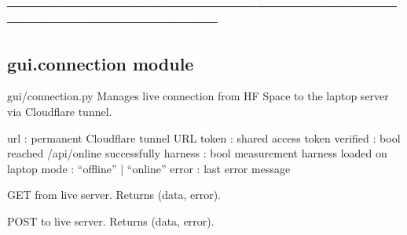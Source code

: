 \documentclass[letterpaper,10pt,english]{sphinxmanual}
\begin{document}
\sphinxAtStartPar
─────────────────────────────────────────────────────────────────────────────

\sphinxstepscope


\subsection{gui.connection module}
\label{\detokenize{gui.connection:module-gui.connection}}\label{\detokenize{gui.connection:gui-connection-module}}\label{\detokenize{gui.connection::doc}}
\sphinxAtStartPar
gui/connection.py
Manages live connection from HF Space to the laptop server via Cloudflare tunnel.
\begin{description}
\sphinxAtStartPar
url       : permanent Cloudflare tunnel URL
token     : shared access token
verified  : bool \sphinxhyphen{} reached /api/online successfully
harness   : bool \sphinxhyphen{} measurement harness loaded on laptop
mode      : “offline” | “online”
error     : last error message

\end{description}

\begin{fulllineitems}
\label{\detokenize{gui.connection:gui.connection.api_get}}
\pysigstartsignatures
\pysiglinewithargsret
{}
{\sphinxparamcomma {}}
{}
\pysigstopsignatures
\sphinxAtStartPar
GET from live server. Returns (data, error).

\end{fulllineitems}


\begin{fulllineitems}
\label{\detokenize{gui.connection:gui.connection.api_post}}
\pysigstartsignatures
\pysiglinewithargsret
{}
{\sphinxparamcomma {}\sphinxparamcomma {}}
{}
\pysigstopsignatures
\sphinxAtStartPar
POST to live server. Returns (data, error).

\end{fulllineitems}
\end{document}
